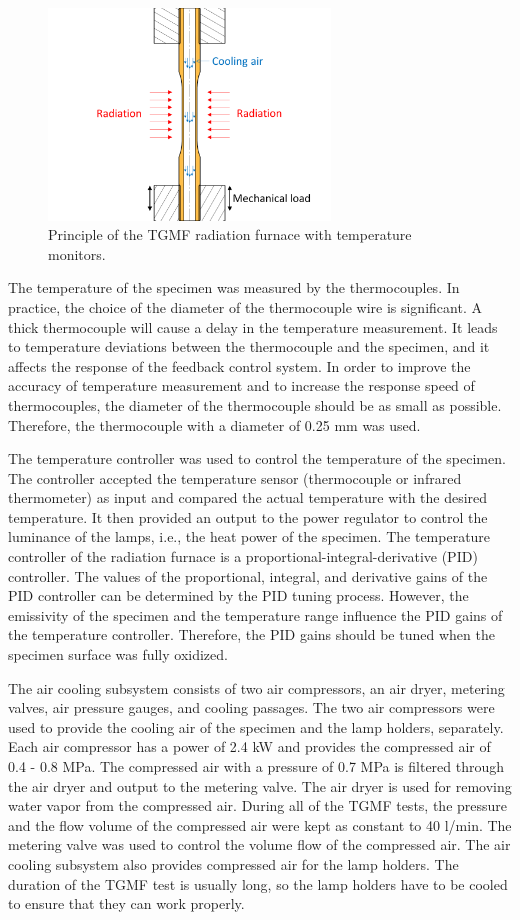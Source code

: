 \documentclass[preprint,5p,twocolumn,10pt,sort&compress]{elsarticle}
\begin{document}
\begin{figure}[!ht]
    \centering
    \includegraphics[width=7.5cm]{cooling.png}
    \caption{Principle of the TGMF radiation furnace with temperature monitors.}
    \label{Fig:cooling}
\end{figure}

The temperature of the specimen was measured by the thermocouples. In practice, the choice of the diameter of the thermocouple wire is significant. A thick thermocouple will cause a delay in the temperature measurement. It leads to temperature deviations between the thermocouple and the specimen, and it affects the response of the feedback control system. In order to improve the accuracy of temperature measurement and to increase the response speed of thermocouples, the diameter of the thermocouple should be as small as possible. Therefore, the thermocouple with a diameter of 0.25 mm was used.

The temperature controller was used to control the temperature of the specimen.
The controller accepted the temperature sensor (thermocouple or infrared thermometer) as input and compared the actual temperature with the desired temperature. It then provided an output to the power regulator to control the luminance of the lamps, i.e., the heat power of the specimen. 
The temperature controller of the radiation furnace is a proportional-integral-derivative (PID) controller. The values of the proportional, integral, and derivative gains of the PID controller can be determined by the PID tuning process.
However, the emissivity of the specimen and the temperature range influence the PID gains of the temperature controller. Therefore, the PID gains should be tuned when the specimen surface was fully oxidized.

The air cooling subsystem consists of two air compressors, an air dryer, metering valves, air pressure gauges, and cooling passages. 
The two air compressors were used to provide the cooling air of the specimen and the lamp holders, separately.
Each air compressor has a power of 2.4 kW and provides the compressed air of 0.4 - 0.8 MPa. The compressed air with a pressure of 0.7 MPa is filtered through the air dryer and output to the metering valve. The air dryer is used for removing water vapor from the compressed air.
During all of the TGMF tests, the pressure and the flow volume of the compressed air were kept as constant to 40 l/min. The metering valve was used to control the volume flow of the compressed air.
The air cooling subsystem also provides compressed air for the lamp holders.
The duration of the TGMF test is usually long, so the lamp holders have to be cooled to ensure that they can work properly.
\end{document}
